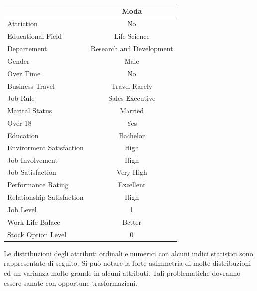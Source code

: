 \documentclass[a4paper,9pt]{article}
\begin{document}
\begin{center}\footnotesize
\begin{tabular}{lc}
\toprule
 &\bfseries Moda \\
\hline
\hline
\rowcolor[gray]{0.9}
Attriction & No\\
Educational Field & Life Science\\
\rowcolor[gray]{0.9}
Departement & Research and Development\\
Gender & Male\\
\rowcolor[gray]{0.9}
Over Time & No\\
Business Travel & Travel Rarely\\
\rowcolor[gray]{0.9}
Job Rule & Sales Executive\\
Marital Status & Married \\
\rowcolor[gray]{0.9}
Over 18 & Yes\\ 
Education & Bachelor\\
\rowcolor[gray]{0.9}
Envirorment Satisfaction & High\\
Job Involvement & High\\
\rowcolor[gray]{0.9}
Job Satisfaction & Very High\\
Performance Rating & Excellent\\
\rowcolor[gray]{0.9}
Relationship Satisfaction & High\\
Job Level & 1\\
\rowcolor[gray]{0.9}
Work Life Balace & Better\\
Stock Option Level & 0\\
\bottomrule 
\end{tabular}
\end{center}
 
Le distribuzioni degli attributi ordinali e numerici con alcuni indici statistici sono rappresentate di seguito.
Si può notare la forte asimmetria di molte distribuzioni ed un varianza molto grande in alcuni attributi. Tali problematiche dovranno essere sanate con opportune trasformazioni.
\end{document}
